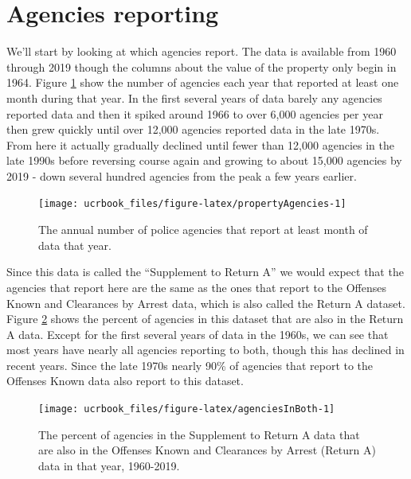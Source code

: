 \documentclass[
  12pt,
  openany]{book}
\begin{document}
\hypertarget{agencies-reporting-3}{%
\section{Agencies reporting}\label{agencies-reporting-3}}

We'll start by looking at which agencies report. The data is available from 1960 through 2019 though the columns about the value of the property only begin in 1964. Figure \ref{fig:propertyAgencies} show the number of agencies each year that reported at least one month during that year. In the first several years of data barely any agencies reported data and then it spiked around 1966 to over 6,000 agencies per year then grew quickly until over 12,000 agencies reported data in the late 1970s. From here it actually gradually declined until fewer than 12,000 agencies in the late 1990s before reversing course again and growing to about 15,000 agencies by 2019 - down several hundred agencies from the peak a few years earlier.

\begin{figure}

{\centering \texttt{[image: ucrbook\_files/figure-latex/propertyAgencies-1]} 

}

\caption{The annual number of police agencies that report at least month of data that year.}\label{fig:propertyAgencies}
\end{figure}

Since this data is called the ``Supplement to Return A'' we would expect that the agencies that report here are the same as the ones that report to the Offenses Known and Clearances by Arrest data, which is also called the Return A dataset. Figure \ref{fig:agenciesInBoth} shows the percent of agencies in this dataset that are also in the Return A data. Except for the first several years of data in the 1960s, we can see that most years have nearly all agencies reporting to both, though this has declined in recent years. Since the late 1970s nearly 90\% of agencies that report to the Offenses Known data also report to this dataset.

\begin{figure}

{\centering \texttt{[image: ucrbook\_files/figure-latex/agenciesInBoth-1]} 

}

\caption{The percent of agencies in the Supplement to Return A data that are also in the Offenses Known and Clearances by Arrest (Return A) data in that year, 1960-2019.}\label{fig:agenciesInBoth}
\end{figure}
\end{document}
